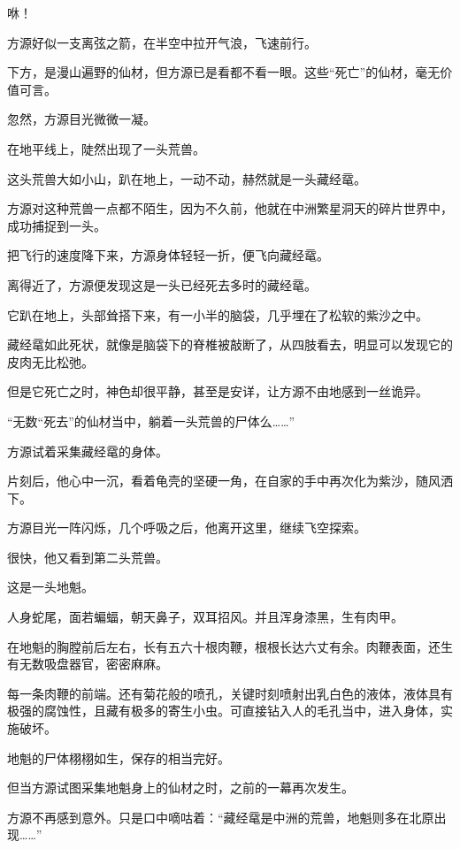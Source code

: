 
\begin{this_body}



咻！

方源好似一支离弦之箭，在半空中拉开气浪，飞速前行。

下方，是漫山遍野的仙材，但方源已是看都不看一眼。这些“死亡”的仙材，毫无价值可言。

忽然，方源目光微微一凝。

在地平线上，陡然出现了一头荒兽。

这头荒兽大如小山，趴在地上，一动不动，赫然就是一头藏经鼋。

方源对这种荒兽一点都不陌生，因为不久前，他就在中洲繁星洞天的碎片世界中，成功捕捉到一头。

把飞行的速度降下来，方源身体轻轻一折，便飞向藏经鼋。

离得近了，方源便发现这是一头已经死去多时的藏经鼋。

它趴在地上，头部耸搭下来，有一小半的脑袋，几乎埋在了松软的紫沙之中。

藏经鼋如此死状，就像是脑袋下的脊椎被敲断了，从四肢看去，明显可以发现它的皮肉无比松弛。

但是它死亡之时，神色却很平静，甚至是安详，让方源不由地感到一丝诡异。

“无数“死去”的仙材当中，躺着一头荒兽的尸体么……”

方源试着采集藏经鼋的身体。

片刻后，他心中一沉，看着龟壳的坚硬一角，在自家的手中再次化为紫沙，随风洒下。

方源目光一阵闪烁，几个呼吸之后，他离开这里，继续飞空探索。

很快，他又看到第二头荒兽。

这是一头地魁。

人身蛇尾，面若蝙蝠，朝天鼻子，双耳招风。并且浑身漆黑，生有肉甲。

在地魁的胸膛前后左右，长有五六十根肉鞭，根根长达六丈有余。肉鞭表面，还生有无数吸盘器官，密密麻麻。

每一条肉鞭的前端。还有菊花般的喷孔，关键时刻喷射出乳白色的液体，液体具有极强的腐蚀性，且藏有极多的寄生小虫。可直接钻入人的毛孔当中，进入身体，实施破坏。

地魁的尸体栩栩如生，保存的相当完好。

但当方源试图采集地魁身上的仙材之时，之前的一幕再次发生。

方源不再感到意外。只是口中嘀咕着：“藏经鼋是中洲的荒兽，地魁则多在北原出现……”


\end{this_body}
